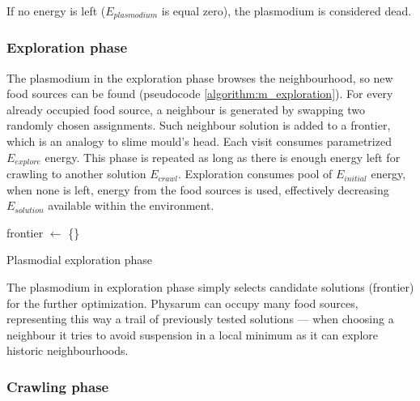\noindent If no energy is left ($E_{plasmodium}$ is equal zero), the plasmodium is considered dead.


\subsubsection{Exploration phase}

The plasmodium in the exploration phase browses the neighbourhood, so new food sources can be found (pseudocode \ref{algorithm:m_exploration}). For every already occupied food source, a neighbour is generated by swapping two randomly chosen assignments. Such neighbour solution is added to a frontier, which is an analogy to slime mould's head. Each visit consumes parametrized $E_{explore}$ energy. This phase is repeated as long as there is enough energy left for crawling to another solution $E_{crawl}$. Exploration consumes pool of $E_{initial}$ energy, when none is left, energy from the food sources is used, effectively decreasing $E_{solution}$ available within the environment.

\begin{algorithm}
  \BlankLine

  frontier $\leftarrow$ \{\}\;

  \;

  \caption{Plasmodial exploration phase}
  \label{algorithm:m_exploration}
\end{algorithm}

The plasmodium in exploration phase simply selects candidate solutions (frontier) for the further optimization. Physarum can occupy many food sources, representing this way a trail of previously tested solutions --- when choosing a neighbour it tries to avoid suspension in a local minimum as it can explore historic neighbourhoods.

\subsubsection{Crawling phase}

